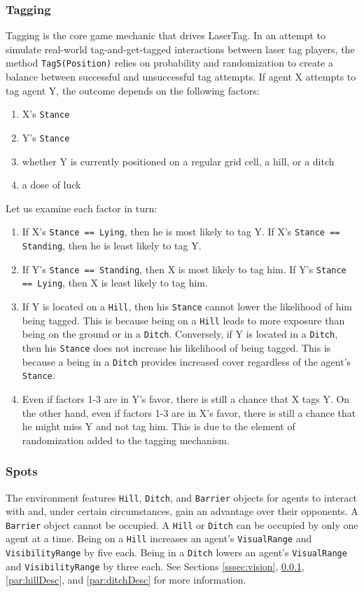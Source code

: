 \documentclass[a4paper,english,DIV=16,11pt,parskip=half,dvipsnames,listof=totoc,index=totoc,bibliography=totoc]{scrartcl}
\begin{document}
\subsubsection{Tagging} \label{sssec:tagging}
Tagging is the core game mechanic that drives LaserTag. In an attempt to simulate real-world tag-and-get-tagged interactions between laser tag players, the method \texttt{Tag5(Position)} relies on probability and randomization to create a balance between successful and unsuccessful tag attempts. If agent X attempts to tag agent Y, the outcome depends on the following factors:
%
\begin{enumerate}
  \item X's \texttt{Stance}
  \item Y's \texttt{Stance}
  \item whether Y is currently positioned on a regular grid cell, a hill, or a ditch
  \item a dose of luck
\end{enumerate}
%
Let us examine each factor in turn:
%
\begin{enumerate}
  \item If X's \texttt{Stance == Lying}, then he is most likely to tag Y. If X's \texttt{Stance == Standing}, then he is least likely to tag Y.
  \item If Y's \texttt{Stance == Standing}, then X is most likely to tag him. If Y's \texttt{Stance == Lying}, then X is least likely to tag him.
  \item If Y is located on a \texttt{Hill}, then his \texttt{Stance} cannot lower the likelihood of him being tagged. This is because being on a \texttt{Hill} leads to more exposure than being on the ground or in a \texttt{Ditch}. Conversely, if Y is located in a \texttt{Ditch}, then his \texttt{Stance} does not increase his likelihood of being tagged. This is because a being in a \texttt{Ditch} provides increased cover regardless of the agent's \texttt{Stance}.
  \item Even if factors 1-3 are in Y's favor, there is still a chance that X tags Y. On the other hand, even if factors 1-3 are in X's favor, there is still a chance that he might miss Y and not tag him. This is due to the element of randomization added to the tagging mechanism.
\end{enumerate}
%
\subsubsection{Spots} \label{sssec:spot}
The environment features \texttt{Hill}, \texttt{Ditch}, and \texttt{Barrier} objects for agents to interact with and, under certain circumstances, gain an advantage over their opponents. A \texttt{Barrier} object cannot be occupied. A \texttt{Hill} or \texttt{Ditch} can be occupied by only one agent at a time. Being on a \texttt{Hill} increases an agent's \texttt{VisualRange} and \texttt{VisibilityRange} by five each. Being in a \texttt{Ditch} lowers an agent's \texttt{VisualRange} and  \texttt{VisibilityRange} by three each. See Sections \ref{sssec:vision}, \ref{sssec:tagging}, \ref{par:hillDesc}, and \ref{par:ditchDesc} for more information.
\end{document}

